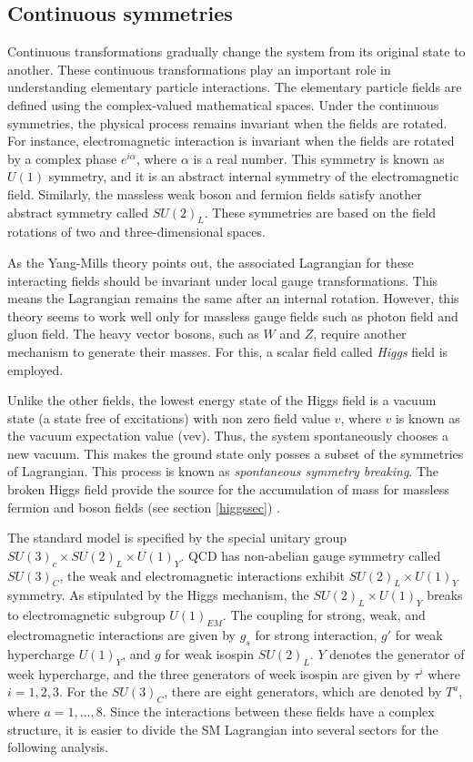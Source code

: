 \subsection{Continuous symmetries}
Continuous transformations gradually change the system from its original state to another. These continuous transformations play an important role in understanding elementary particle interactions. 
The elementary particle fields are defined using the complex-valued mathematical spaces. Under the continuous symmetries, the physical process remains invariant when the fields are rotated. 
For instance, electromagnetic interaction is invariant when the fields are rotated by a complex phase $e^{i\alpha}$, where $\alpha$ is a real number. This symmetry is known as $U(1)$ symmetry, and it is an abstract internal symmetry of the electromagnetic field. Similarly, the massless weak boson and fermion fields satisfy another abstract symmetry called $SU(2)_L$. These symmetries are based on the field rotations of two and three-dimensional spaces.\par
As the Yang-Mills theory \cite{Yang:1954ek} points out, the associated Lagrangian for these interacting fields should be invariant under local gauge transformations. This means the Lagrangian remains the same after an internal rotation. However, this theory seems to work well only for massless gauge fields such as photon field and gluon field. The heavy vector bosons, such as $W$ and $Z$, require another mechanism to generate their masses. For this, a scalar field called \textit{Higgs} field is employed.\par
Unlike the other fields, the lowest energy state of the Higgs field is a vacuum state (a state free of excitations) with non zero field value $v$, where $v$ is known as the vacuum expectation value (vev). Thus, the system spontaneously chooses a new vacuum. This makes the ground state only posses a subset of the symmetries of Lagrangian. This process is known as \textit{spontaneous symmetry breaking}. The broken Higgs field provide the source for the accumulation of mass for massless fermion and boson fields (see section \ref{higgssec}) \cite{Lancaster:2014pza}.\par
The standard model is specified by the special unitary group $SU(3)_c\times SU(2)_L\times U(1)_Y$. QCD has non-abelian gauge symmetry called $SU(3)_C$, the weak and electromagnetic interactions exhibit $SU(2)_L\times U(1)_Y$ symmetry.  As stipulated by the Higgs mechanism, the $SU(2)_L\times U(1)_Y$ breaks to electromagnetic subgroup $U(1)_{EM}$. The coupling for strong, weak, and electromagnetic interactions are given by $g_s$ for strong interaction, $g'$ for weak hypercharge $U(1)_Y$, and $g$ for weak isospin $SU(2)_L$. $ Y$ denotes the generator of week hypercharge, and the three generators of week isospin are given by $\tau^i$ where $i=1,2,3$. For the $SU(3)_C$, there are eight generators, which are denoted by $T^a$, where $a=1,...,8$. Since the interactions between these fields have a complex structure, it is easier to divide the SM Lagrangian into several sectors for the following analysis.

